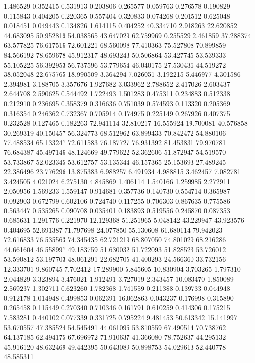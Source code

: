 1.486529
0.352415
0.531913
0.203806
0.265577
0.059763
0.276578
0.190829
0.115843
0.404205
0.220365
0.557404
0.320833
0.074268
0.201512
0.625048
0.018451
0.049443
0.134826
1.614115
0.404252
40.334710
2.918263
22.620852
44.683095
50.952819
54.038565
43.647029
62.759969
0.255529
2.461859
37.288374
63.577825
76.617516
72.601221
68.560098
77.410363
75.527808
70.899859
84.566192
78.659678
45.912317
48.693243
50.506864
53.427745
53.539333
55.105225
56.392953
56.737596
53.779654
46.040175
27.530436
44.519272
38.052048
22.675765
18.990509
3.364294
7.026051
3.192215
5.446977
4.301586
2.394981
3.188705
3.357676
1.927682
3.033962
2.788652
2.417026
2.603437
2.644708
2.590625
0.544492
1.722493
1.501283
0.475311
0.234883
0.512338
0.212910
0.236695
0.358379
0.316636
0.751039
0.574593
0.113320
0.205369
0.316354
0.246362
0.732367
0.705914
0.174975
0.225149
0.267926
0.407375
0.232528
0.127465
0.182263
72.941114
32.810217
16.555924
19.700081
40.576858
30.269319
40.150457
56.324773
68.512962
63.899433
70.842472
54.880106
77.488534
65.133247
72.611583
76.187727
76.931392
81.453831
79.970781
76.684387
45.497146
48.124669
49.779622
52.362606
51.872947
54.519570
53.733867
52.023345
53.612757
53.135344
46.157365
25.153693
27.489245
22.386496
23.776296
13.875383
6.988257
6.491934
4.988815
3.462457
7.082781
3.424505
4.021024
6.275130
4.845869
1.406114
1.540166
1.259985
2.272911
2.050956
1.569233
1.559147
0.914681
0.357736
0.140730
0.554714
0.365987
0.092903
0.672799
0.602106
0.724740
0.117255
0.706303
0.867635
0.775586
0.563447
0.535265
0.090708
0.035401
0.183893
0.519556
0.245870
0.087353
0.685631
1.291776
0.221970
12.129368
51.251965
5.048142
43.229947
43.923576
0.404695
52.691387
71.797698
24.077850
55.130608
61.680114
79.942023
72.616833
76.535563
74.345435
62.721219
68.807050
74.801029
68.216286
44.661604
46.558997
49.183759
51.630032
51.722093
51.828523
53.726012
53.590812
53.197703
48.061291
22.682705
41.400293
24.566360
33.732156
12.333701
9.860745
7.702412
17.289900
5.845605
10.830904
3.703265
1.797310
2.044829
3.323894
3.476021
1.912491
3.727019
2.343457
10.083470
1.850089
2.569237
1.302711
0.623260
1.782368
1.741559
0.211388
0.139733
0.044948
0.912178
1.014948
0.499853
0.062391
16.062863
0.043237
0.176998
0.315890
0.265458
0.115449
0.270340
0.710346
0.161791
0.610259
0.414306
0.175215
7.583281
0.440102
0.077339
0.331725
0.795224
9.481453
50.613342
15.141997
53.670557
47.385524
54.545491
44.061095
53.810559
67.490514
70.738762
64.137185
62.494175
67.696972
71.910637
41.366080
78.752637
44.295132
45.916120
48.632469
49.442395
50.643089
50.898753
54.029613
52.440778
48.585311
